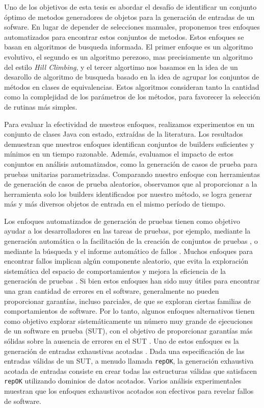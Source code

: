 Uno de los objetivos de esta tesis es abordar el desafío de identificar un conjunto óptimo de metodos generadores de objetos para la generación de entradas de un sofware. En lugar de depender de selecciones manuales, proponemos tres enfoques automatizados para encontrar estos conjuntos de metodos. Estos enfoques se basan en algoritmos de busqueda informada.  El primer enfoque es un algoritmo evolutivo, el segundo es un algoritmo perezoso, mas precisiamente un algoritmo del estilo \emph{Hill Climbing}, y el tercer algortimo nos basamos en la idea de un desarollo de algoritmo de busqueda basado en la idea de agrupar los conjuntos de métodos en clases de equivalencias. Estos algoritmos consideran tanto la cantidad como la complejidad de los parámetros de los métodos, para favorecer la selección de rutinas más simples.

Para evaluar la efectividad de nuestros enfoques, realizamos experimentos en un conjunto de clases Java con estado, extraídas de la literatura. Los resultados demuestran que nuestros enfoques identifican conjuntos de builders suficientes y mínimos en un tiempo razonable. Además, evaluamos el impacto de estos conjuntos en análisis automatizados, como la generación de casos de prueba para pruebas unitarias parametrizadas. Comparando nuestro enfoque con herramientas de generación de casos de prueba aleatorios, observamos que al proporcionar a la herramienta solo los builders identificados por nuestro método, se logra generar más y más diversos objetos de entrada en el mismo período de tiempo.

Los enfoques automatizados de generación de pruebas tienen como objetivo ayudar a los desarrolladores en las tareas de pruebas, por ejemplo, mediante la generación automática o la facilitación de la creación de conjuntos de pruebas \cite{Cadar08,Luckow14,Fraser11}, o mediante la búsqueda y el informe automático de fallos \cite{Pacheco07,Ma15,Godefroid05,Marinov01,Boyapati02,Godefroid12}. Muchos enfoques para encontrar fallos implican algún componente aleatorio, que evita la exploración sistemática del espacio de comportamientos y mejora la eficiencia de la generación de pruebas \cite{Pacheco07,Ma15,Fraser11}. Si bien estos enfoques han sido muy útiles para encontrar una gran cantidad de errores en el software, generalmente no pueden proporcionar garantías, incluso parciales, de que se exploran ciertas familias de comportamientos de software. Por lo tanto, algunos enfoques alternativos tienen como objetivo explorar sistemáticamente un número muy grande de ejecuciones de un software en prueba (SUT), con el objetivo de proporcionar garantías más sólidas sobre la ausencia de errores en el SUT \cite{Marinov01,Boyapati02,Godefroid05,Godefroid18}. Uno de estos enfoques es la generación de entradas exhaustivas acotadas \cite{Marinov01,Boyapati02}. Dada una especificación de las entradas válidas de un SUT, a menudo llamada \texttt{repOK}, la generación exhaustiva acotada de entradas consiste en crear todas las estructuras válidas que satisfacen \texttt{repOK} utilizando dominios de datos acotados. Varios análisis experimentales muestran que los enfoques exhaustivos acotados son efectivos para revelar fallos de software.

